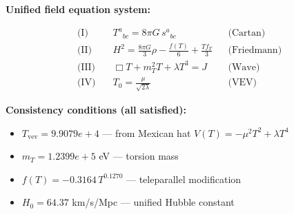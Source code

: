 
\textbf{Unified field equation system:}

\begin{align}
  \text{(I)} \quad & T^a{}_{bc} = 8\pi G \, s^a{}_{bc} && \text{(Cartan)} \\
  \text{(II)} \quad & H^2 = \frac{8\pi G}{3}\rho - \frac{f(T)}{6} + \frac{Tf_T}{3} && \text{(Friedmann)} \\
  \text{(III)} \quad & \Box T + m_T^2 T + \lambda T^3 = J && \text{(Wave)} \\
  \text{(IV)} \quad & T_0 = \frac{\mu}{\sqrt{2\lambda}} && \text{(VEV)}
\end{align}

\textbf{Consistency conditions (all satisfied):}
\begin{itemize}
  \item $T_{\text{vev}} = 9.9079e+4$ — from Mexican hat $V(T) = -\mu^2 T^2 + \lambda T^4$
  \item $m_T = 1.2399e+5$ eV — torsion mass
  \item $f(T) = -0.3164 \, T^{0.1270}$ — teleparallel modification
  \item $H_0 = 64.37$ km/s/Mpc — unified Hubble constant
\end{itemize}